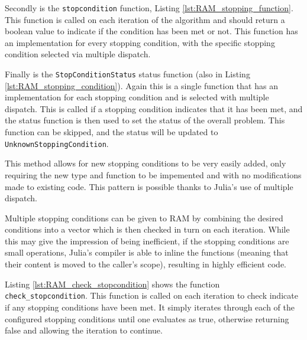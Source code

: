

Secondly is the \texttt{stopcondition} function, Listing \ref{lst:RAM_stopping_function}. This function is called on each iteration of the algorithm and should return a boolean value to indicate if the condition has been met or not. This function has an implementation for every stopping condition, with the specific stopping condition selected via multiple dispatch.



Finally is the \texttt{StopConditionStatus} status function (also in Listing \ref{lst:RAM_stopping_condition}). Again this is a single function that has an implementation for each stopping condition and is selected with multiple dispatch. This is called if a stopping condition indicates that it has been met, and the status function is then used to set the status of the overall problem. This function can be skipped, and the status will be updated to \texttt{UnknownStoppingCondition}.

This method allows for new stopping conditions to be very easily added, only requiring the new type and function to be impemented and with no modifications made to existing code. This pattern is possible thanks to Julia's use of multiple dispatch.

Multiple stopping conditions can be given to RAM by combining the desired conditions into a vector which is then checked in turn on each iteration. While this may give the impression of being inefficient, if the stopping conditions are small operations, Julia's compiler is able to inline the functions (meaning that their content is moved to the caller's scope), resulting in highly efficient code.

Listing \ref{lst:RAM_check_stopcondition} shows the function \texttt{check\_stopcondition}. This function is called on each iteration to check indicate if any stopping conditions have been met. It simply iterates through each of the configured stopping conditions until one evaluates as true, otherwise returning false and allowing the iteration to continue.




